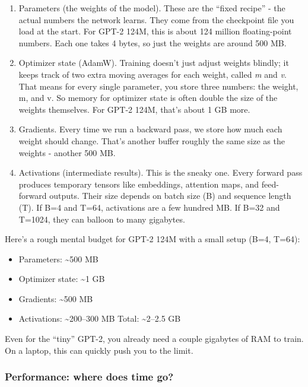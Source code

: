 \documentclass[
  letterpaper,
  DIV=11,
  numbers=noendperiod]{scrreprt}
\providecommand{\tightlist}{%
  \setlength{\itemsep}{0pt}\setlength{\parskip}{0pt}}
\begin{document}
\begin{enumerate}
\def\labelenumi{\arabic{enumi}.}
\item
  Parameters (the weights of the model). These are the ``fixed recipe''
  - the actual numbers the network learns. They come from the checkpoint
  file you load at the start. For GPT-2 124M, this is about 124 million
  floating-point numbers. Each one takes 4 bytes, so just the weights
  are around 500 MB.
\item
  Optimizer state (AdamW). Training doesn't just adjust weights blindly;
  it keeps track of two extra moving averages for each weight, called
  \emph{m} and \emph{v}. That means for every single parameter, you
  store three numbers: the weight, m, and v. So memory for optimizer
  state is often double the size of the weights themselves. For GPT-2
  124M, that's about 1 GB more.
\item
  Gradients. Every time we run a backward pass, we store how much each
  weight should change. That's another buffer roughly the same size as
  the weights - another 500 MB.
\item
  Activations (intermediate results). This is the sneaky one. Every
  forward pass produces temporary tensors like embeddings, attention
  maps, and feed-forward outputs. Their size depends on batch size (B)
  and sequence length (T). If B=4 and T=64, activations are a few
  hundred MB. If B=32 and T=1024, they can balloon to many gigabytes.
\end{enumerate}

Here's a rough mental budget for GPT-2 124M with a small setup (B=4,
T=64):

\begin{itemize}
\tightlist
\item
  Parameters: \textasciitilde500 MB
\item
  Optimizer state: \textasciitilde1 GB
\item
  Gradients: \textasciitilde500 MB
\item
  Activations: \textasciitilde200--300 MB Total: \textasciitilde2--2.5
  GB
\end{itemize}

Even for the ``tiny'' GPT-2, you already need a couple gigabytes of RAM
to train. On a laptop, this can quickly push you to the limit.

\subsubsection{Performance: where does time
go?}\label{performance-where-does-time-go}
\end{document}
